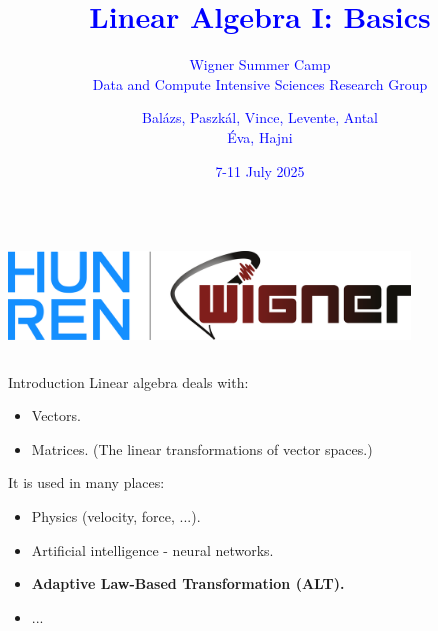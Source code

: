 \documentclass{beamer}
\title{\textcolor{blue}{Linear Algebra I: Basics}}
\subtitle{\textcolor{blue}{Wigner Summer Camp \\ Data and Compute Intensive Sciences Research Group}}
\author{\textcolor{blue}{Balázs, Paszkál, Vince, Levente, Antal \\ Éva, Hajni}}
\date{\textcolor{blue}{7-11 July 2025}}
\begin{document}
\begin{frame}
  \titlepage
  \begin{columns}
    \centering
    \centering
    \includegraphics[width=0.8\textwidth]{../img/logo.png}
    \centering
  \end{columns}
\end{frame}

\begin{frame}{Introduction}
    Linear algebra deals with:
    \begin{itemize}
        \item Vectors.
        \item Matrices. (The linear transformations of vector spaces.)
    \end{itemize}

    It is used in many places:
    \begin{itemize}
        \item Physics (velocity, force, ...).
        \item Artificial intelligence - neural networks.
        \item \textbf{Adaptive Law-Based Transformation (ALT).}
        \item ...
    \end{itemize}
\end{frame}
\end{document}
